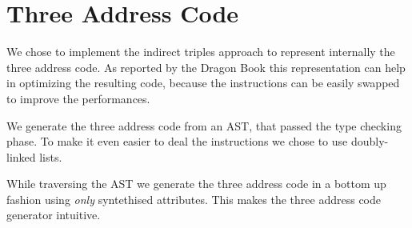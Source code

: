 \section{Three Address Code}
We chose to implement the indirect triples approach to represent internally
the three address code. As reported by the Dragon Book this representation 
can help in optimizing the resulting code, because the instructions can be 
easily swapped to improve the performances.

We generate the three address code from an AST, that passed the type checking
phase. To make it even easier to deal the instructions we chose to use 
doubly-linked lists.

While traversing the AST we generate the three address code in a bottom up
fashion using \emph{only} syntethised attributes. This makes the three address
code generator intuitive.
 
